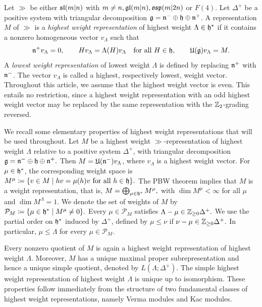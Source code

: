 Let $\gg$ be either $\sl(m\vert n)$ with $m\neq n, \gl(m\vert n), \osp(m\vert 2n)$ or $F(4)$. Let $\Delta^+$ be a positive system with triangular decomposition $\gg=\nn^-\oplus\hh\oplus\nn^+$. A representation $M$ of $\gg$ is a \emph{highest weight representation} of highest weight $\Lambda\in\hh^{\ast}$ if it contains a nonzero homogeneous vector $v_\Lambda$ such that
\begin{equation}
\nn^+v_\Lambda=0,\qquad
Hv_\Lambda=\Lambda(H)v_\Lambda\quad\text{for all }H\in\hh,\qquad
\UE(\gg)v_\Lambda=M.
\end{equation}
A \emph{lowest weight representation} of lowest weight $\Lambda$ is defined by replacing $\nn^+$ with $\nn^-$. The vector $v_\Lambda$ is called a highest, respectively lowest, weight vector. Throughout this article, we assume that the highest weight vector is even. This entails no restriction, since a highest weight representation with an odd highest weight vector may be replaced by the same representation with the $\ZZ_2$-grading reversed.

We recall some elementary properties of highest weight representations that will be used throughout. Let $M$ be a highest weight $\gg$-representation of highest weight $\Lambda$ relative to a positive system $\Delta^{+}$, with triangular decomposition
$
\gg=\nn^{-}\oplus\hh\oplus\nn^{+}.
$
Then $M=\UE(\nn^{-})v_{\Lambda}$, where $v_{\Lambda}$ is a highest weight vector. For $\mu\in\hh^{\ast}$, the corresponding weight space is
$
M^{\mu}\coloneqq\{v\in M\mid hv=\mu(h)v\text{ for all }h\in\hh\}.
$
The PBW theorem implies that $M$ is a weight representation, that is,
$
M=\bigoplus_{\mu\in\hh^{\ast}}M^{\mu},
$
with $\dim M^{\mu}<\infty$ for all $\mu$ and $\dim M^{\Lambda}=1$. We denote the set of weights of $M$ by
$
\mathcal{P}_{M}\coloneqq\{\mu\in\hh^{\ast}\mid M^{\mu}\neq0\}.
$
Every $\mu\in\mathcal{P}_{M}$ satisfies
$
\Lambda-\mu\in\ZZ_{\geq0}\Delta^{+}.
$ We use the partial order on $\hh^{\ast}$ induced by $\Delta^{+}$, defined by
$
\mu\leq\nu
$
if
$
\nu-\mu\in\ZZ_{\geq0}\Delta^{+}.
$
In particular, $\mu\leq\Lambda$ for every $\mu\in\mathcal{P}_{M}$.

Every nonzero quotient of $M$ is again a highest weight representation of highest weight $\Lambda$. Moreover, $M$ has a unique maximal proper subrepresentation and hence a unique simple quotient, denoted by $L(\Lambda;\Delta^{+})$. The simple highest weight representation of highest weight $\Lambda$ is unique up to isomorphism. These properties follow immediately from the structure of two fundamental classes of highest weight representations, namely Verma modules and Kac modules.

